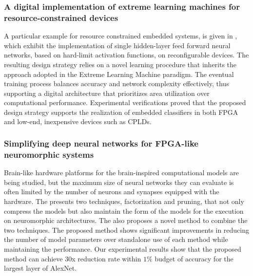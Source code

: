 \subsubsection{A digital implementation of extreme learning machines for resource-constrained devices}
A particular example for resource constrained embedded systems, is given in \cite{ragusa2018digital}, which exhibit the implementation of single hidden-layer feed forward neural networks, based on hard-limit activation functions, on reconﬁgurable devices. The resulting design strategy relies on a novel learning procedure that inherits the approach adopted in the Extreme Learning Machine paradigm. The eventual training process balances accuracy and network complexity effectively, thus supporting a digital architecture that prioritizes area utilization over computational performance. Experimental veriﬁcations proved that the proposed design strategy supports the realization of embedded classiﬁers in both FPGA and low-end, inexpensive devices such as CPLDs.

\subsubsection{Simplifying deep neural networks for FPGA-like neuromorphic systems}
Brain-like hardware platforms for the brain-inspired computational models are being studied, but the maximum size of neural networks they can evaluate is often limited by the number of neurons and synapses equipped with the hardware. The \cite{chung2018simplifying} presents two techniques, factorization and pruning, that not only compress the models but also maintain the form of the models for the execution on neuromorphic architectures. The \cite{chung2018simplifying} also proposes a novel method to combine the two techniques. The proposed method shows signiﬁcant improvements in reducing the number of model parameters over standalone use of each method while maintaining the performance. Our experimental results show that the proposed method can achieve 30x reduction rate within $1\%$ budget of accuracy for the largest layer of AlexNet.

